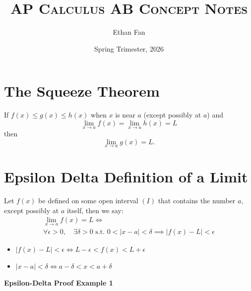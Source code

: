 \documentclass{article}
\title{\vspace*{-40pt}\textsc{AP Calculus AB Concept Notes}}
\author{Ethan Fan}
\date{Spring Trimester, 2026}
\newcommand{\theorem}[2]{\begin{tcolorbox}[title={#1},colback=blue!5!white,colframe=blue!75!black,parbox=false] #2 \end{tcolorbox}}
\begin{document}
\fontsize{11pt}{12pt}\selectfont
\setlength{\abovedisplayskip}{\abovedisplayskip/2}
\setlength{\belowdisplayskip}{\belowdisplayskip/2}
\setlength{\parindent}{0pt}
\setlength{\parskip}{2ex plus 0.5ex minus 0.2ex}
\maketitle

\tableofcontents

\section{The Squeeze Theorem}
\theorem{The Squeeze Theorem}{
If $f(x)\le g(x) \le h(x)$ when $x$ is near $a$ (except possibly at $a$) and
\begin{equation*}
    \lim_{x \to a}f(x) = \lim_{x \to a} h(x) = L
\end{equation*}
then
\begin{equation*}
    \lim_{x \to a} g(x)=L.
\end{equation*}
}

\section{Epsilon Delta Definition of a Limit}

\theorem{Epsilon-Delta Definition of a Limit}{
Let $f(x)$ be defined on some open interval $(I)$ that contains the number $a$, except possibly at $a$ itself, then we say:
\begin{gather*}
    \lim_{x \to a} f(x) = L \iff\\
    \forall \epsilon >0, \quad \exists \delta > 0 \text{ s.t. } 0<|x-a|<\delta \implies |f(x)-L|< \epsilon
\end{gather*}
\begin{itemize}
    \item $|f(x)-L|< \epsilon \iff L-\epsilon < f(x) < L+\epsilon$
    \item $|x-a|<\delta \iff a-\delta < x < a + \delta$
\end{itemize}
}

\textbf{Epsilon-Delta Proof Example 1}
\end{document}
